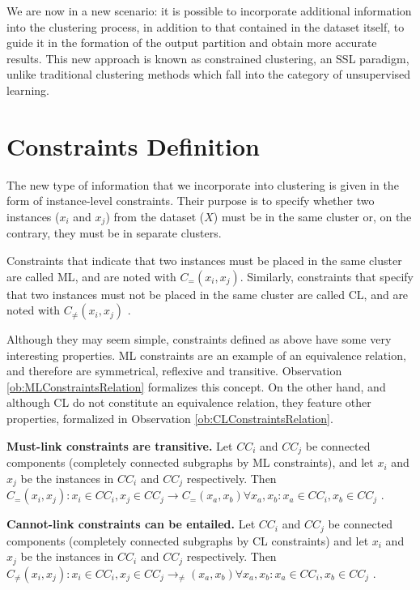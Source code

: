 We are now in a new scenario: it is possible to incorporate additional information into the clustering process, in addition to that contained in the dataset itself, to guide it in the formation of the output partition and obtain more accurate results. This new approach is known as constrained clustering, an \acf{SSL} paradigm, unlike traditional clustering methods which fall into the category of unsupervised learning. 

\section{Constraints Definition} \label{sec:ConstDef}

The new type of information that we incorporate into clustering is given in the form of instance-level constraints. Their purpose is to specify whether two instances ($x_i$ and $x_j$) from the dataset ($X$) must be in the same cluster or, on the contrary, they must be in separate clusters.

Constraints that indicate that two instances must be placed in the same cluster are called \acf{ML}, and are noted with $C_=(x_i,x_j)$. Similarly, constraints that specify that two instances must not be placed in the same cluster are called \acf{CL}, and are noted with $C_{\neq}(x_i,x_j)$ \cite{wagstaff2000clustering}.

Although they may seem simple, constraints defined as above have some very interesting properties. \acs{ML} constraints are an example of an equivalence relation, and therefore are symmetrical, reflexive and transitive. Observation \ref{ob:MLConstraintsRelation} formalizes this concept. On the other hand, and although \acs{CL} do not constitute an equivalence relation, they feature other properties, formalized in Observation \ref{ob:CLConstraintsRelation}.

\begin{observation}
	\textbf{Must-link constraints are transitive.} Let $CC_i$ and $CC_j$ be connected components (completely connected subgraphs by \acs{ML} constraints), and let $x_i$ and $x_j$ be the instances in $CC_i$ and $CC_j$ respectively. Then $C_=(x_i,x_j): x_i \in CC_i, x_j \in CC_j \rightarrow C_=(x_a,x_b) \forall x_a, x_b: x_a\in CC_i, x_b \in CC_j$ \cite{davidson2007survey}.
	\label{ob:MLConstraintsRelation}
\end{observation}

\begin{observation}
	\textbf{Cannot-link constraints can be entailed.} Let $CC_i$ and $CC_j$ be connected components (completely connected subgraphs by \acs{CL} constraints) and let $x_i$ and $x_j$ be the instances in $CC_i$ and $CC_j$ respectively. Then $C_{\neq}(x_i, x_j): x_i \in CC_i, x_j \in CC_j \rightarrow _{\neq}(x_a, x_b) \forall x_a, x_b: x_a\in CC_i, x_b \in CC_j$ \cite{davidson2007survey}
	\label{ob:CLConstraintsRelation}.
\end{observation}

